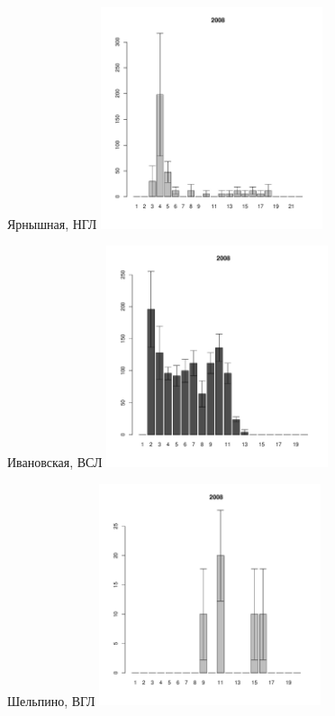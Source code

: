\begin{figure}[h]
\begin{minipage}[b]{.46\linewidth}
	\begin{center}
	{\tiny Ярнышная, НГЛ}
	\includegraphics[width=65mm]{../Barenc_Sea/Yarnyshnaya/low_2008_.pdf}
	\end{center}
	\end{minipage}
	\hfil %
	\begin{minipage}[b]{.46\linewidth}
	\begin{center}	
	{\tiny Ивановская, ВСЛ}
	\includegraphics[width=65mm]{../Barenc_Sea/Ivanovskaya/sizestr2008.pdf}
	\end{center}
	\end{minipage}
	\begin{minipage}[b]{.46\linewidth}
	\begin{center}
	{\tiny Шельпино, ВГЛ}
	\includegraphics[width=65mm]{../Barenc_Sea/Shel'pino/high_2008_.pdf}

\end{center}
\end{minipage}
\end{figure}
